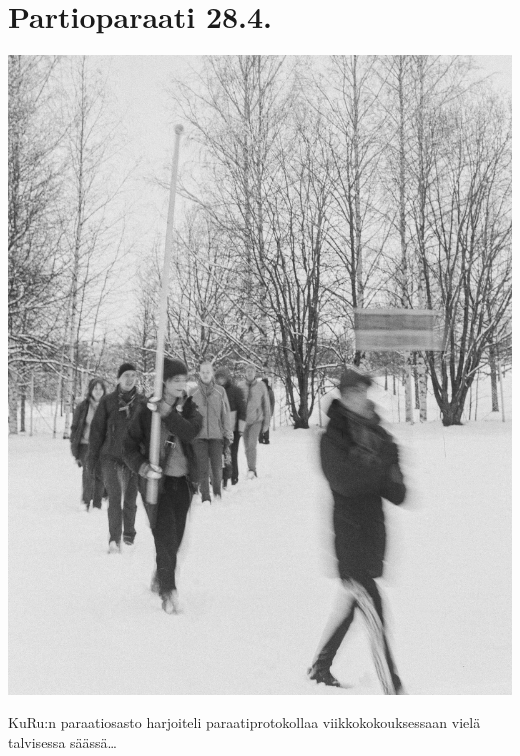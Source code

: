 
\section{Partioparaati 28.4.}

\vspace*{-0.64cm}
\begin{multicols}{2}

	\begin{center}
		\noindent\includegraphics[width=0.85\linewidth]{assets/paraati1}
	\end{center}

	\vspace*{-0.32cm}
	\small\noindent KuRu:n paraatiosasto harjoiteli \mbox{paraati}protokollaa
	viikkokokouksessaan vielä talvisessa säässä\ldots

	\columnbreak


\end{multicols}

